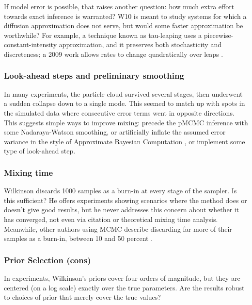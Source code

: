 \documentclass{article}
\begin{document}
If model error is possible, that raises another question: how much extra effort towards exact inference is warranted? W10 is meant to study systems for which a diffusion approximation does not serve, but would some faster approximation be worthwhile? For example, a technique known as tau-leaping uses a piecewise-constant-intensity approximation, and it preserves both stochasticity and discreteness; a 2009 work allows rates to change quadratically over leaps \cite{sehl2009accurate}.

\subsubsection{Look-ahead steps and preliminary smoothing}
In many experiments, the particle cloud survived several stages, then underwent a sudden collapse down to a single mode. This seemed to match up with spots in the simulated data where consecutive error terms went in opposite directions. This suggests simple ways to improve mixing: precede the pMCMC inference with some Nadaraya-Watson smoothing, or artificially inflate the assumed error variance in the style of Approximate Bayesian Computation \cite{beaumont2002approximate}, or implement some type of look-ahead step.

\subsubsection{Mixing time}
Wilkinson discards 1000 samples as a burn-in at every stage of the sampler. Is this sufficient? He offers experiments showing scenarios where the method does or doesn't give good results, but he never addresses this concern about whether it has converged, not even via citation or theoretical mixing time analysis. Meanwhile, other authors using MCMC describe discarding far more of their samples as a burn-in, between 10 and 50 percent \cite{gupta2014comparison,zechner2014scalable}. %

\subsubsection{Prior Selection (cons)}
In experiments, Wilkinson's priors cover four orders of magnitude, but they are centered (on a log scale) exactly over the true parameters. Are the results robust to choices of prior that merely cover the true values?
\end{document}
